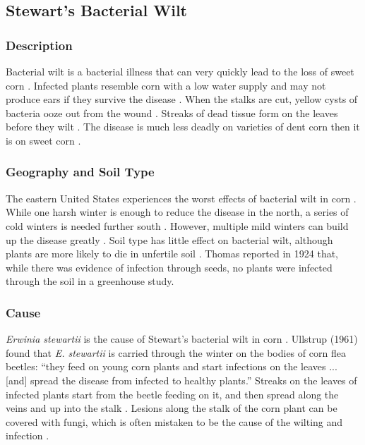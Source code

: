\documentclass[12pt]{article}
\begin{document}
\subsection{Stewart's Bacterial Wilt}

\subsubsection{Description}

Bacterial wilt is a bacterial illness that can very quickly lead to the loss of sweet corn \autocite{robert1967bacterial}. Infected plants resemble corn with a low water supply and may not produce ears if they survive the disease \autocite{ullstrup1961corn}. When the stalks are cut, yellow cysts of bacteria ooze out from the wound \autocite{ullstrup1961corn}. Streaks of dead tissue form on the leaves before they wilt \autocite{robert1967bacterial}. The disease is much less deadly on varieties of dent corn then it is on sweet corn \autocite{rand1933bacterial}.

\subsubsection{Geography and Soil Type}

The eastern United States experiences the worst effects of bacterial wilt in corn \autocite{ullstrup1961corn, robert1967bacterial}. While one harsh winter is enough to reduce the disease in the north, a series of cold winters is needed further south \autocite{robert1967bacterial}. However, multiple mild winters can build up the disease greatly \autocite{robert1967bacterial}. Soil type has little effect on bacterial wilt, although plants are more likely to die in unfertile soil \autocite{ullstrup1961corn, thomas1924stewart}. Thomas reported in 1924 that, while there was evidence of infection through seeds, no plants were infected through the soil in a greenhouse study.

\subsubsection{Cause}

\emph{Erwinia stewartii} is the cause of Stewart's bacterial wilt in corn \autocite{ullstrup1961corn}. Ullstrup (1961) found that \emph{E. stewartii} is carried through the winter on the bodies of corn flea beetles: ``they feed on young corn plants and start infections on the leaves ... [and] spread the disease from infected to healthy plants.'' Streaks on the leaves of infected plants start from the beetle feeding on it, and then spread along the veins and up into the stalk \autocite{robert1967bacterial}. Lesions along the stalk of the corn plant can be covered with fungi, which is often mistaken to be the cause of the wilting and infection \autocite{ullstrup1961corn}.
\end{document}
